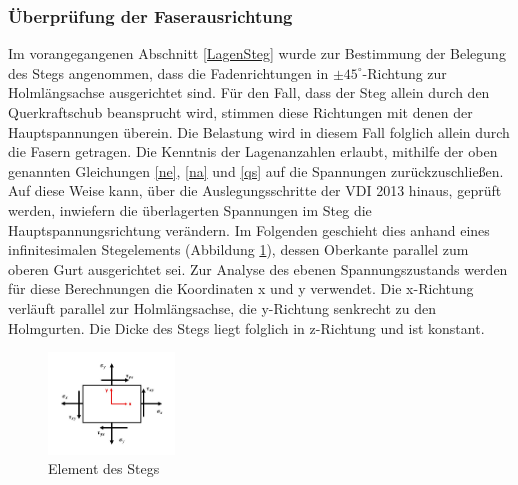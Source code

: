 \subsubsection{Überprüfung der Faserausrichtung}\label{Überprüfung}
Im vorangegangenen Abschnitt \ref{LagenSteg} wurde zur Bestimmung der Belegung des Stegs angenommen, dass die Fadenrichtungen in $ \pm 45^{\circ} $-Richtung zur Holmlängsachse ausgerichtet sind. Für den Fall, dass der Steg allein durch den Querkraftschub beansprucht wird, stimmen diese Richtungen mit denen der Hauptspannungen überein. Die Belastung wird in diesem Fall folglich allein durch die Fasern getragen. Die Kenntnis der Lagenanzahlen erlaubt, mithilfe der oben genannten Gleichungen \ref{ne}, \ref{na} und \ref{qs} auf die Spannungen zurückzuschließen. Auf diese Weise kann, über die Auslegungsschritte der VDI 2013 hinaus, geprüft werden, inwiefern die überlagerten Spannungen im Steg die Hauptspannungsrichtung verändern. Im Folgenden geschieht dies anhand eines infinitesimalen Stegelements (Abbildung \ref{fig: Element}), dessen Oberkante parallel zum oberen Gurt ausgerichtet sei. Zur Analyse des ebenen Spannungszustands werden für diese Berechnungen die Koordinaten x und y verwendet. Die x-Richtung verläuft parallel zur Holmlängsachse, die y-Richtung senkrecht zu den Holmgurten. Die Dicke des Stegs liegt folglich in z-Richtung und ist konstant.  

\begin{figure}[h]
	\includegraphics[width=0.3\textwidth]{Bilder/Element.jpg}
	\centering
	\caption{Element des Stegs}
	\label{fig: Element}
\end{figure}

